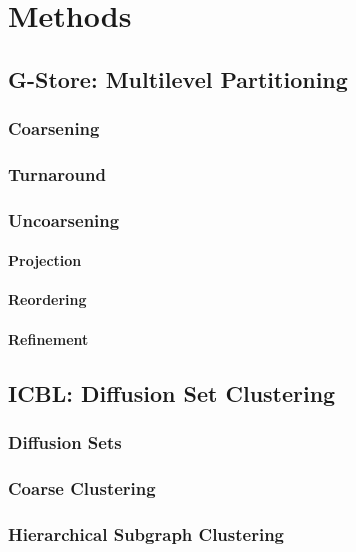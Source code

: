 \chapter{Methods}\label{\positionnumber} 
\section{G-Store: Multilevel Partitioning}\label{\positionnumber}
    \subsection{Coarsening}\label{\positionnumber}
    \subsection{Turnaround}\label{\positionnumber}
    \subsection{Uncoarsening}\label{\positionnumber}
        \subsubsection{Projection}\label{\positionnumber}
        \subsubsection{Reordering}\label{\positionnumber}
        \subsubsection{Refinement}\label{\positionnumber}

\section{ICBL: Diffusion Set Clustering}\label{\positionnumber}
    \subsection{Diffusion Sets}\label{\positionnumber}
    \subsection{Coarse Clustering}\label{\positionnumber}
    \subsection{Hierarchical Subgraph Clustering}\label{\positionnumber}
